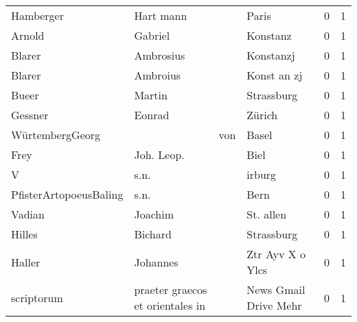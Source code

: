 \begin{tabular}{llllrr}
                Hamberger &                          Hart mann &             &                                       Paris &          0 &         1 \\
                   Arnold &                            Gabriel &             &                                    Konstanz &          0 &         1 \\
                   Blarer &                          Ambrosius &             &                                   Konstanzj &          0 &         1 \\
                   Blarer &                           Ambroius &             &                                 Konst an zj &          0 &         1 \\
                    Bueer &                             Martin &             &                                  Strassburg &          0 &         1 \\
                  Gessner &                             Eonrad &             &                                      Zürich &          0 &         1 \\
          WürtembergGeorg &                                    &         von &                                       Basel &          0 &         1 \\
                     Frey &                         Joh. Leop. &             &                                        Biel &          0 &         1 \\
                        V &                               s.n. &             &                                      irburg &          0 &         1 \\
   PfisterArtopoeusBaling &                               s.n. &             &                                        Bern &          0 &         1 \\
                   Vadian &                            Joachim &             &                                   St. allen &          0 &         1 \\
                   Hilles &                            Bichard &             &                                  Strassburg &          0 &         1 \\
                   Haller &                           Johannes &             &                            Ztr Ayv X o Ylcs &          0 &         1 \\
               scriptorum &   praeter graecos et orientales in &             &                       News Gmail Drive Mehr &          0 &         1 \\

\end{tabular}
